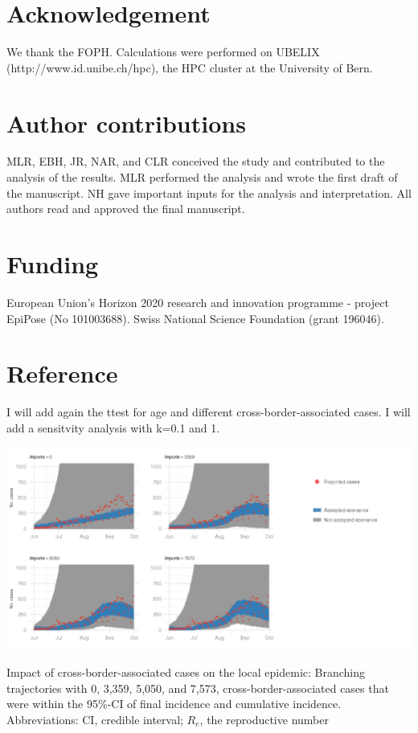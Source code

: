 \documentclass[10pt, a4paper, twoside]{article}
\begin{document}
\begin{multicols}{2}
\section{Acknowledgement}
We thank the FOPH.  Calculations were performed on UBELIX (http://www.id.unibe.ch/hpc), the HPC cluster at the University of Bern.

\section{Author contributions}
MLR, EBH, JR, NAR, and CLR conceived the study and contributed to the analysis of the results.
MLR performed the analysis and wrote the first draft of the manuscript.
NH gave important inputs for the analysis and interpretation.
All authors read and approved the final manuscript.

\section{Funding}
European Union’s Horizon 2020 research and innovation programme - project EpiPose (No 101003688). Swiss National Science Foundation (grant 196046).

\section{Reference}



\end{multicols}

I will add again the ttest for age and different cross-border-associated cases.
I will add a sensitvity analysis with k=0.1 and 1.

\clearpage
\begin{suppfigure}[h]
\centering
\includegraphics[scale=0.3]{SF1_2021-05-26.png}
\caption{Impact of cross-border-associated cases on the local epidemic:
Branching trajectories with 0, 3,359, 5,050, and 7,573, cross-border-associated cases that were within the 95\%-CI of final incidence and cumulative incidence.
Abbreviations: CI, credible interval; $R_e$, the reproductive number}
\label{sf1}
\end{suppfigure}
\end{document}
